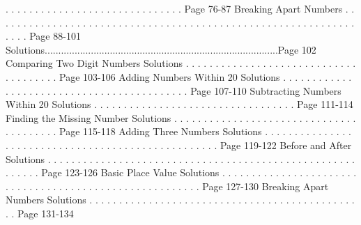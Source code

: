 \documentclass{article}%
\begin{document}
.%
.%
.%
.%
.%
.%
.%
.%
.%
.%
.%
.%
.%
.%
.%
.%
.%
.%
.%
.%
.%
.%
.%
.%
.%
.%
.%
.%
.%
.%
Page 76{-}87%
\newline%
Breaking Apart Numbers%
.%
.%
.%
.%
.%
.%
.%
.%
.%
.%
.%
.%
.%
.%
.%
.%
.%
.%
.%
.%
.%
.%
.%
.%
.%
.%
.%
.%
.%
.%
.%
.%
.%
.%
.%
.%
.%
.%
.%
.%
.%
.%
.%
.%
.%
.%
.%
.%
.%
.%
.%
.%
.%
.%
.%
.%
.%
.%
.%
.%
.%
.%
.%
.%
.%
Page 88{-}101%
\newline%
Solutions......................................................................................Page 102%
\newline%
Comparing Two Digit Numbers Solutions%
.%
.%
.%
.%
.%
.%
.%
.%
.%
.%
.%
.%
.%
.%
.%
.%
.%
.%
.%
.%
.%
.%
.%
.%
.%
.%
.%
.%
.%
.%
.%
.%
.%
.%
.%
.%
.%
.%
Page 103{-}106%
\newline%
Adding Numbers Within 20 Solutions%
.%
.%
.%
.%
.%
.%
.%
.%
.%
.%
.%
.%
.%
.%
.%
.%
.%
.%
.%
.%
.%
.%
.%
.%
.%
.%
.%
.%
.%
.%
.%
.%
.%
.%
.%
.%
.%
.%
.%
.%
.%
.%
.%
Page 107{-}110%
\newline%
Subtracting Numbers Within 20 Solutions%
.%
.%
.%
.%
.%
.%
.%
.%
.%
.%
.%
.%
.%
.%
.%
.%
.%
.%
.%
.%
.%
.%
.%
.%
.%
.%
.%
.%
.%
.%
.%
.%
.%
.%
Page 111{-}114%
\newline%
Finding the Missing Number Solutions%
.%
.%
.%
.%
.%
.%
.%
.%
.%
.%
.%
.%
.%
.%
.%
.%
.%
.%
.%
.%
.%
.%
.%
.%
.%
.%
.%
.%
.%
.%
.%
.%
.%
.%
.%
.%
.%
.%
.%
.%
Page 115{-}118%
\newline%
Adding Three Numbers Solutions%
.%
.%
.%
.%
.%
.%
.%
.%
.%
.%
.%
.%
.%
.%
.%
.%
.%
.%
.%
.%
.%
.%
.%
.%
.%
.%
.%
.%
.%
.%
.%
.%
.%
.%
.%
.%
.%
.%
.%
.%
.%
.%
.%
.%
.%
.%
.%
.%
.%
.%
.%
Page 119{-}122%
\newline%
Before and After Solutions%
.%
.%
.%
.%
.%
.%
.%
.%
.%
.%
.%
.%
.%
.%
.%
.%
.%
.%
.%
.%
.%
.%
.%
.%
.%
.%
.%
.%
.%
.%
.%
.%
.%
.%
.%
.%
.%
.%
.%
.%
.%
.%
.%
.%
.%
.%
.%
.%
.%
.%
.%
.%
.%
.%
.%
.%
.%
.%
Page 123{-}126%
\newline%
Basic Place Value Solutions%
.%
.%
.%
.%
.%
.%
.%
.%
.%
.%
.%
.%
.%
.%
.%
.%
.%
.%
.%
.%
.%
.%
.%
.%
.%
.%
.%
.%
.%
.%
.%
.%
.%
.%
.%
.%
.%
.%
.%
.%
.%
.%
.%
.%
.%
.%
.%
.%
.%
.%
.%
.%
.%
.%
.%
.%
Page 127{-}130%
\newline%
Breaking Apart Numbers Solutions%
.%
.%
.%
.%
.%
.%
.%
.%
.%
.%
.%
.%
.%
.%
.%
.%
.%
.%
.%
.%
.%
.%
.%
.%
.%
.%
.%
.%
.%
.%
.%
.%
.%
.%
.%
.%
.%
.%
.%
.%
.%
.%
.%
.%
.%
.%
.%
Page 131{-}134%
\newline%
\newpage
\end{document}
